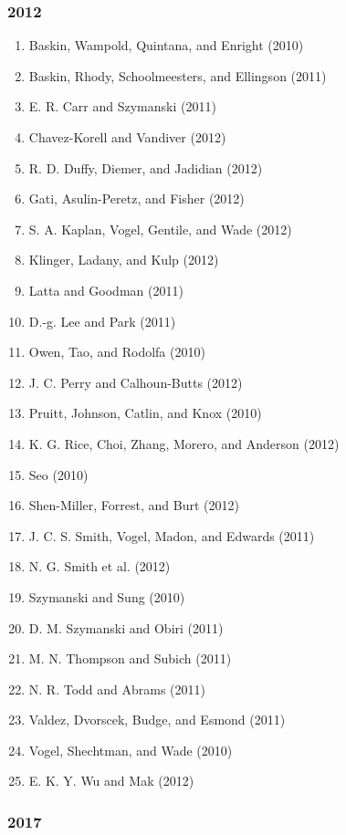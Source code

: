 \documentclass[english,man]{apa6}
\providecommand{\tightlist}{%
  \setlength{\itemsep}{0pt}\setlength{\parskip}{0pt}}
\theoremstyle{definition}
\theoremstyle{definition}
\theoremstyle{definition}
\theoremstyle{remark}
\begin{document}
\subsubsection{2012}\label{section-10}

\begin{enumerate}
\def\labelenumi{\arabic{enumi})}
\tightlist
\item
  Baskin, Wampold, Quintana, and Enright (2010)
\item
  Baskin, Rhody, Schoolmeesters, and Ellingson (2011)
\item
  E. R. Carr and Szymanski (2011)
\item
  Chavez-Korell and Vandiver (2012)
\item
  R. D. Duffy, Diemer, and Jadidian (2012)
\item
  Gati, Asulin-Peretz, and Fisher (2012)
\item
  S. A. Kaplan, Vogel, Gentile, and Wade (2012)
\item
  Klinger, Ladany, and Kulp (2012)
\item
  Latta and Goodman (2011)
\item
  D.-g. Lee and Park (2011)
\item
  Owen, Tao, and Rodolfa (2010)
\item
  J. C. Perry and Calhoun-Butts (2012)
\item
  Pruitt, Johnson, Catlin, and Knox (2010)
\item
  K. G. Rice, Choi, Zhang, Morero, and Anderson (2012)
\item
  Seo (2010)
\item
  Shen-Miller, Forrest, and Burt (2012)
\item
  J. C. S. Smith, Vogel, Madon, and Edwards (2011)
\item
  N. G. Smith et al. (2012)
\item
  Szymanski and Sung (2010)
\item
  D. M. Szymanski and Obiri (2011)
\item
  M. N. Thompson and Subich (2011)
\item
  N. R. Todd and Abrams (2011)
\item
  Valdez, Dvorscek, Budge, and Esmond (2011)
\item
  Vogel, Shechtman, and Wade (2010)
\item
  E. K. Y. Wu and Mak (2012)
\end{enumerate}

\subsubsection{2017}\label{section-11}
\end{document}
